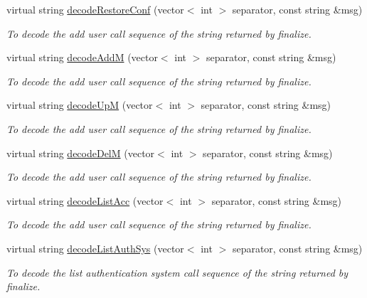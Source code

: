 \begin{DoxyCompactItemize}
virtual string \hyperlink{classUMSMapper_a26597d9d63ee7db4110669b59460f74f}{decodeRestoreConf} (vector$<$ int $>$ separator, const string \&msg)
\begin{DoxyCompactList}\small\item\em To decode the add user call sequence of the string returned by finalize. \item\end{DoxyCompactList}\item 
virtual string \hyperlink{classUMSMapper_a8b40c596d15368717b8a62a00d80df22}{decodeAddM} (vector$<$ int $>$ separator, const string \&msg)
\begin{DoxyCompactList}\small\item\em To decode the add user call sequence of the string returned by finalize. \item\end{DoxyCompactList}\item 
virtual string \hyperlink{classUMSMapper_a11c776ef36bfe7237e920dfdd3c0c1ec}{decodeUpM} (vector$<$ int $>$ separator, const string \&msg)
\begin{DoxyCompactList}\small\item\em To decode the add user call sequence of the string returned by finalize. \item\end{DoxyCompactList}\item 
virtual string \hyperlink{classUMSMapper_a8b218eb1620678b625db8444dab8226c}{decodeDelM} (vector$<$ int $>$ separator, const string \&msg)
\begin{DoxyCompactList}\small\item\em To decode the add user call sequence of the string returned by finalize. \item\end{DoxyCompactList}\item 
virtual string \hyperlink{classUMSMapper_aca69a6e37499b1e2536521048ff40403}{decodeListAcc} (vector$<$ int $>$ separator, const string \&msg)
\begin{DoxyCompactList}\small\item\em To decode the add user call sequence of the string returned by finalize. \item\end{DoxyCompactList}\item 
virtual string \hyperlink{classUMSMapper_a6f7a53785ea8ee15b34cc2843dd4b726}{decodeListAuthSys} (vector$<$ int $>$ separator, const string \&msg)
\begin{DoxyCompactList}\small\item\em To decode the list authentication system call sequence of the string returned by finalize. \item\end{DoxyCompactList}\item 

\end{DoxyCompactItemize}
